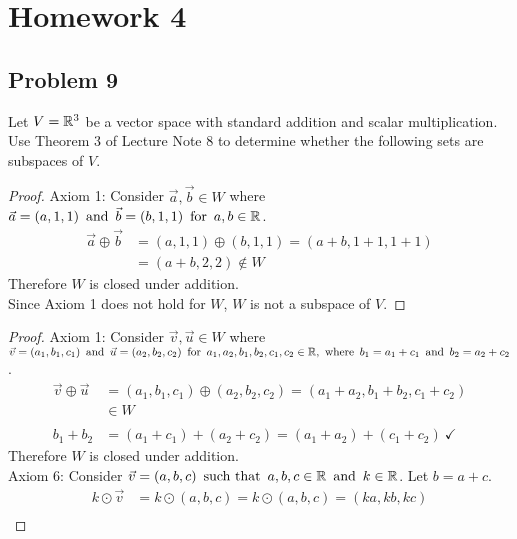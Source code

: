 \documentclass{article}
\begin{document}
\section*{Homework 4}

\subsection*{Problem 9}
Let $V = \mathbb{R}^3$ be a vector space with standard addition and scalar multiplication. Use Theorem 3 of Lecture Note 8 to determine whether the following sets are subspaces of $V$.
\begin{enumerate}
    \begin{proof}
        Axiom 1: Consider $\vec{a},\vec{b} \in W$ where $\vec{a} = (a,1,1) \operatorname{~\text{and}~} \vec{b} = (b,1,1) \operatorname{~\text{for}~} a,b \in \mathbb{R}$.
        \begin{align*}
            \vec{a} \oplus \vec{b} & = (a,1,1) \oplus (b,1,1) = (a+b,1+1,1+1) \\
                                   & = (a+b,2,2) \not \in W
        \end{align*}
        Therefore $W$ is  closed under addition. \\
        Since Axiom 1 does not hold for $W$, $W$ is not a subspace of $V$.
    \end{proof}
    \begin{proof}
        Axiom 1: Consider $\vec{v},\vec{u} \in W$ where $\vec{v} = (a_1,b_1,c_1) \operatorname{~\text{and}~} \vec{u} = (a_2,b_2,c_2) \operatorname{~\text{for}~} a_1,a_2,b_1,b_2,c_1,c_2 \in \mathbb{R}, \operatorname{~\text{where}~} b_1 = a_1 + c_1 \operatorname{~\text{and}~} b_2 = a_2 + c_2$.
        \begin{align*}
            \vec{v} \oplus \vec{u} & = (a_1,b_1,c_1) \oplus (a_2,b_2,c_2) = (a_1+a_2,b_1+b_2,c_1+c_2)   \\
                                   & \in W                                                              \\ \\
            b_1 + b_2              & = (a_1 + c_1) + (a_2 + c_2) = (a_1 + a_2) + (c_1 + c_2)~\checkmark
        \end{align*}
        Therefore $W$ is closed under addition. \\
        Axiom 6: Consider $\vec{v} = (a,b,c) \operatorname{~\text{such that}~} a,b,c \in \mathbb{R} \operatorname{~\text{and}~} k \in \mathbb{R}$. Let $b = a+c$.
        \begin{align*}
            k \odot \vec{v} & = k \odot (a,b,c) = k \odot (a,b,c) = (ka, kb, kc) \\

\end{align*}
\end{proof}
\end{enumerate}
\end{document}
